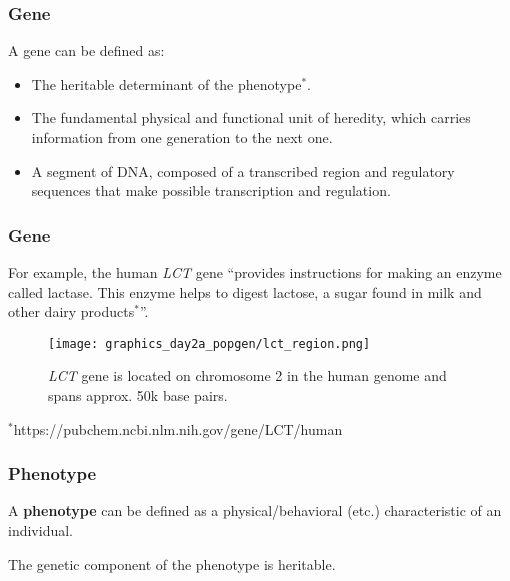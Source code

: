 \documentclass{beamer}
\newcommand{\1}{\ensuremath{\mathbf{1}}}
\begin{document}
\begin{frame}\frametitle{Gene}
	A gene can be defined as:
	\begin{itemize}
		\item The heritable determinant of the phenotype$^{*}$.
		\item The fundamental physical and functional unit of heredity, which carries information from one generation to the next one.
		\item A segment of DNA, composed of a transcribed region and regulatory sequences that make possible transcription and regulation.
	\end{itemize}
\end{frame}
%
%
%
\begin{frame}\frametitle{Gene}
	For example, the human \emph{LCT} gene ``provides instructions for making an enzyme called lactase. This enzyme helps to digest lactose, a sugar found in milk and other dairy products$^{*}$''.
	\begin{figure}
	\begin{center}
		\texttt{[image: graphics\_day2a\_popgen/lct\_region.png]}
	\end{center}
	\caption{\emph{LCT} gene is located on chromosome 2 in the human genome and spans approx. 50k base pairs.}
	\end{figure}
	 {\small $^{*}$https://pubchem.ncbi.nlm.nih.gov/gene/LCT/human}
\end{frame}
%
%
%
\begin{frame}\frametitle{Phenotype}
	A \textbf{phenotype} can be defined as a physical/behavioral (etc.) characteristic of an individual.\\[3ex]
	\begin{block}{}
		The genetic component of the phenotype is heritable.
	\end{block}
\end{frame}
%
%
%
\end{document}

